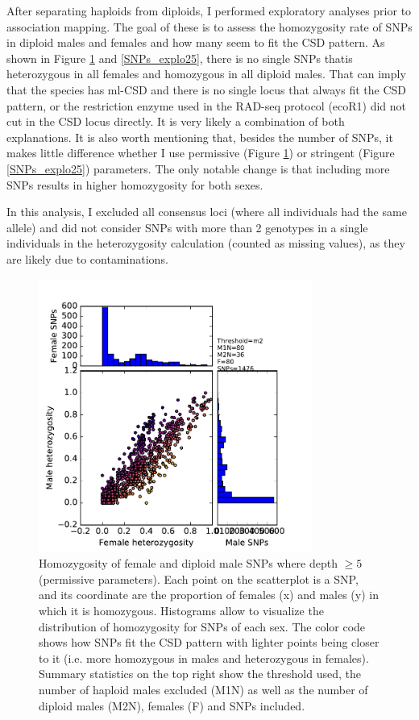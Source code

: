 \documentclass[10pt,a4paper]{report}
\begin{document}
\FloatBarrier

After separating haploids from diploids, I performed exploratory analyses prior to association mapping. The goal of these is to assess the homozygosity rate of SNPs in diploid males and females and how many seem to fit the CSD pattern. As shown in Figure \ref{SNPs_explo5} and \ref{SNPs_explo25}, there is no single SNPs thatis heterozygous in all females and homozygous in all diploid males. That can imply that the species has ml-CSD and there is no single locus that always fit the CSD pattern, or the restriction enzyme used in the RAD-seq protocol (ecoR1) did not cut in the CSD locus directly. It is very likely a combination of both explanations. It is also worth mentioning that, besides the number of SNPs, it makes little difference whether I use permissive (Figure \ref{SNPs_explo5}) or stringent (Figure \ref{SNPs_explo25}) parameters. The only notable change is that including more SNPs results in higher homozygosity for both sexes.

In this analysis, I excluded all consensus loci (where all individuals had the same allele) and did not consider SNPs with more than 2 genotypes in a single individuals in the heterozygosity calculation (counted as missing values), as they are likely due to contaminations.

\begin{figure}[h]
	\begin{center}
		\includegraphics[width=0.8\textwidth]{exclu_haplo/d5assoc_explo/m2}
		\caption{Homozygosity of female and diploid male SNPs where depth $\geq 5$ (permissive parameters). Each point on the scatterplot is a SNP, and its coordinate are the proportion of females (x) and males (y) in which it is homozygous. Histograms allow to visualize the distribution of homozygosity for SNPs of each sex. The color code shows how SNPs fit the CSD pattern with lighter points being closer to it (i.e. more homozygous in males and heterozygous in females). Summary statistics on the top right show the threshold used, the number of haploid males excluded (M1N) as well as the number of diploid males (M2N), females (F) and SNPs included.}
		\label{SNPs_explo5}
	\end{center}
\end{figure}
\end{document}
